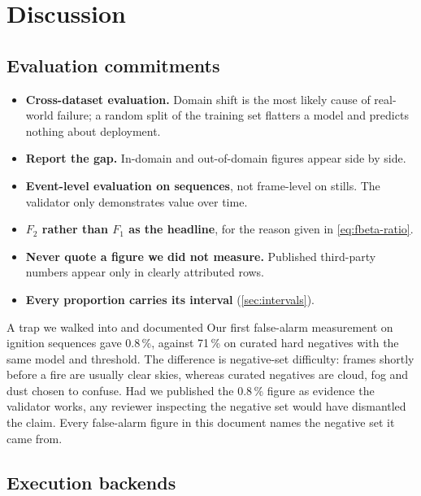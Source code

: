 \section{Discussion}
\label{sec:discussion}

\subsection{Evaluation commitments}

\begin{itemize}
  \item \textbf{Cross-dataset evaluation.} Domain shift is the most likely
        cause of real-world failure; a random split of the training set
        flatters a model and predicts nothing about deployment.
  \item \textbf{Report the gap.} In-domain and out-of-domain figures appear
        side by side.
  \item \textbf{Event-level evaluation on sequences}, not frame-level on
        stills. The validator only demonstrates value over time.
  \item \textbf{$F_2$ rather than $F_1$ as the headline}, for the reason given
        in \cref{eq:fbeta-ratio}.
  \item \textbf{Never quote a figure we did not measure.} Published
        third-party numbers appear only in clearly attributed rows.
  \item \textbf{Every proportion carries its interval} (\cref{sec:intervals}).
\end{itemize}

\begin{recorded}{A trap we walked into and documented}
Our first false-alarm measurement on ignition sequences gave 0.8\,\%, against
71\,\% on curated hard negatives with the same model and threshold. The
difference is negative-set difficulty: frames shortly before a fire are
usually clear skies, whereas curated negatives are cloud, fog and dust chosen
to confuse. Had we published the 0.8\,\% figure as evidence the validator
works, any reviewer inspecting the negative set would have dismantled the
claim. Every false-alarm figure in this document names the negative set it
came from.
\end{recorded}

\subsection{Execution backends}
\label{sec:backends}

